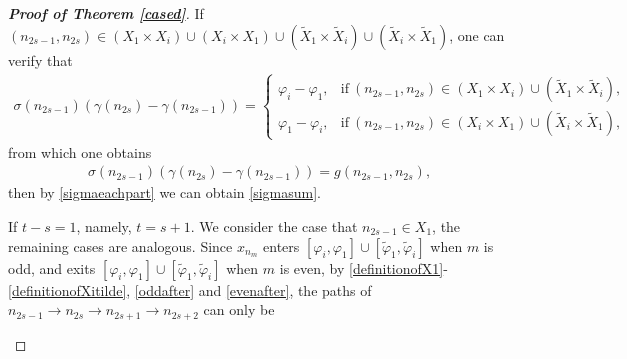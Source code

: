 \documentclass[12pt]{amsart}
\theoremstyle{plain}
\theoremstyle{definition}
\begin{document}
\begin{proof}[\textbf{Proof of Theorem \ref{cased}}]
If $(n_{2s-1},n_{2s})\in\left(X_1\times X_i\right)\cup \left(X_i\times X_1\right)\cup \left(\tilde{X}_1\times \tilde{X}_i\right)\cup \left(\tilde{X}_i\times \tilde{X}_1\right)$, one can verify that 
\begin{align}
	\sigma(n_{2s-1})(\gamma(n_{{2s}})-\gamma(n_{2s-1}))=\begin{cases}
		\varphi_i-\varphi_1, &\mathrm{if}\ (n_{2s-1},n_{2s})\in (X_1\times X_i)\cup \left(\tilde{X}_1\times\tilde{X}_i\right),\nonumber\\
		\varphi_1-\varphi_i,&\mathrm{if}\ (n_{2s-1},n_{2s})\in (X_i\times X_1)\cup \left(\tilde{X}_i\times\tilde{X}_1\right),\nonumber
	\end{cases}
\end{align}
from which one obtains
\begin{align}
\sigma(n_{2s-1})(\gamma(n_{{2s}})-\gamma(n_{2s-1}))=g(n_{2s-1},n_{2s}),\nonumber
\end{align}
then by \eqref{sigmaeachpart} we can obtain \eqref{sigmasum}.

If $t-s=1$, namely, $t=s+1$. 
We consider the case that $n_{2s-1}\in X_1$, the remaining cases are analogous. 
Since $x_{n_m}$ enters $[\varphi_i,\varphi_1]\cup[\tilde{\varphi}_1,\tilde{\varphi}_i]$ when $m$ is odd, and exits $[\varphi_i,\varphi_1]\cup[\tilde{\varphi}_1,\tilde{\varphi}_i]$ when $m$ is even, by \eqref{definitionofX1}-\eqref{definitionofXitilde}, \eqref{oddafter} and \eqref{evenafter}, the paths of $n_{2s-1}\to n_{2s}\to n_{2s+1}\to n_{2s+2}$ can only be
\begin{figure}[H]
%
\caption{}
\end{figure}


\end{proof}
\end{document}
